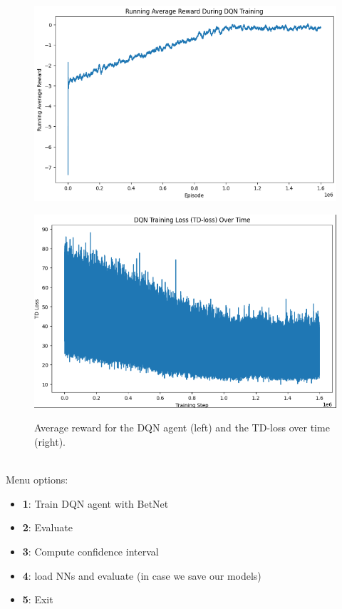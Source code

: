 \documentclass{article}
\begin{document}
\begin{figure}[h!]
  \centering
  \begin{minipage}{0.48\textwidth}
    \centering
    \includegraphics[width=\linewidth]{Images/dqn_reward.png}
    \label{fig:left_plot}
  \end{minipage}\hfill
  \begin{minipage}{0.48\textwidth}
    \centering
    \includegraphics[width=\linewidth]{Images/td_;oss.png}
    \label{fig:right_plot}
  \end{minipage}
  \caption{Average reward for the DQN agent (left) and the TD-loss over time (right).}
\end{figure}


\\
\noindent Menu options:
\begin{itemize}
  \item {\bf 1}: Train DQN agent with BetNet
  \item {\bf 2}: Evaluate 
  \item {\bf 3}: Compute confidence interval
  \item {\bf 4}: load NNs and evaluate (in case we save our models)
  \item {\bf 5}: Exit
\end{itemize}
\end{document}
